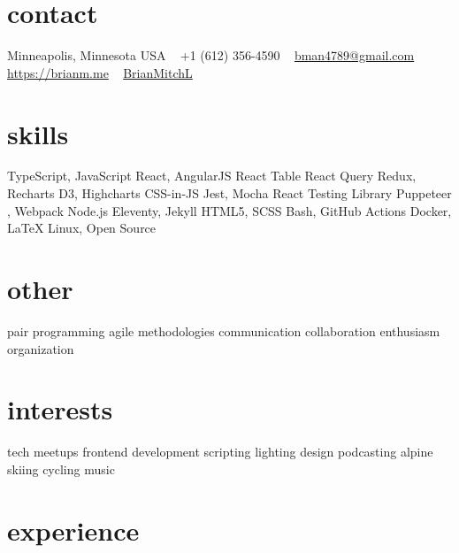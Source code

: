 \documentclass[]{cv-style} %
\begin{document}
\lastupdated


\begin{aside} %
\section{contact}
\small{Minneapolis, Minnesota USA}
~
+1 (612) 356-4590
~
\href{mailto:bman4789@gmail.com}{bman4789@gmail.com}
~
\href{https://brianm.me}{https://brianm.me}
~
\href{https://github.com/BrianMitchL}{\textcolor{headercolor}{ }BrianMitchL}
\section{skills}
TypeScript, JavaScript
React, AngularJS
React Table
React Query
Redux, Recharts
D3, Highcharts
CSS-in-JS
Jest, Mocha
React Testing Library
Puppeteer
, Webpack
Node.js
Eleventy, Jekyll
HTML5, SCSS
Bash, GitHub Actions
Docker, \LaTeX
Linux, Open Source
\section{other}
pair programming
agile methodologies
communication
collaboration
enthusiasm
organization
\section{interests}
tech meetups
frontend development
scripting
lighting design
podcasting
alpine skiing
cycling
music
\end{aside}



\section{experience}

%
%
%
%
\end{document}
